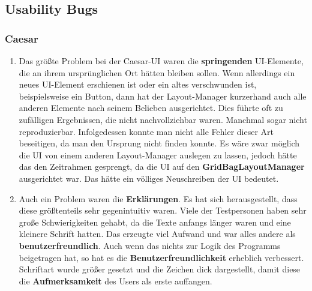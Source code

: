 \documentclass{article}
\begin{document}
  \subsection{Usability Bugs}
    \subsubsection{Caesar}
     \begin{enumerate}
      \item Das größte Problem bei der Caesar-UI waren die \textbf{springenden} UI-Elemente, die an ihrem ursprünglichen Ort hätten bleiben sollen.
            Wenn allerdings ein neues UI-Element erschienen ist oder ein altes verschwunden ist, beispielsweise ein Button, dann hat der Layout-Manager kurzerhand auch alle anderen
            Elemente nach seinem Belieben ausgerichtet. Dies führte oft zu zufälligen Ergebnissen, die nicht nachvollziehbar waren. Manchmal sogar nicht reproduzierbar.
            Infolgedessen konnte man nicht alle Fehler dieser Art beseitigen, da man den Ursprung nicht finden konnte.\newline 
            Es wäre zwar möglich die UI von einem anderen Layout-Manager auslegen zu lassen, jedoch hätte das den Zeitrahmen gesprengt, da die UI
            auf den \textbf{GridBagLayoutManager} ausgerichtet war. Das hätte ein völliges Neuschreiben der UI bedeutet. 
            
      \item Auch ein Problem waren die \textbf{Erklärungen}. Es hat sich herausgestellt, dass diese größtenteils sehr {gegenintuitiv} waren.
            Viele der Testpersonen haben sehr große Schwierigkeiten gehabt, da die Texte anfangs länger waren und eine kleinere Schrift hatten.
            Das erzeugte viel Aufwand und war alles andere als \textbf{benutzerfreundlich}.\newline
            Auch wenn das nichts zur Logik des Programms beigetragen hat, so hat es die \textbf{Benutzerfreundlichkeit} erheblich verbessert. 
            Schriftart wurde größer gesetzt und die Zeichen dick dargestellt, damit diese die \textbf{Aufmerksamkeit} des Users als erste auffangen.
            

\end{enumerate}
\end{document}
